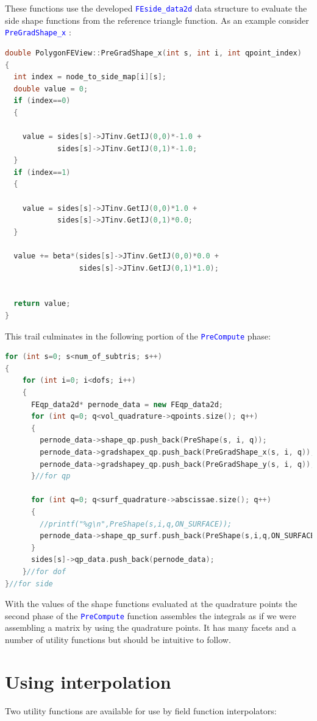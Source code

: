 \documentclass[11pt,letterpaper,titlepage]{article}
\newcommand{\xmltag}[1]{\textcolor{blue}{ \texttt{#1}} }
\begin{document}
These functions use the developed \xmltag{FEside\_data2d} data structure to evaluate the side shape functions from the reference triangle function.
\newline
\newline
As an example consider \xmltag{PreGradShape\_x}:
\newline 
\begin{lstlisting}[language=c++]
double PolygonFEView::PreGradShape_x(int s, int i, int qpoint_index)
{
  int index = node_to_side_map[i][s];
  double value = 0;
  if (index==0)
  {

    value = sides[s]->JTinv.GetIJ(0,0)*-1.0 +
            sides[s]->JTinv.GetIJ(0,1)*-1.0;
  }
  if (index==1)
  {

    value = sides[s]->JTinv.GetIJ(0,0)*1.0 +
            sides[s]->JTinv.GetIJ(0,1)*0.0;
  }

  value += beta*(sides[s]->JTinv.GetIJ(0,0)*0.0 +
                 sides[s]->JTinv.GetIJ(0,1)*1.0);


  return value;
}
\end{lstlisting}

This trail culminates in the following portion of the \xmltag{PreCompute} phase:
\begin{lstlisting}[language=c++]
for (int s=0; s<num_of_subtris; s++)
{
	for (int i=0; i<dofs; i++)
	{
	  FEqp_data2d* pernode_data = new FEqp_data2d;
	  for (int q=0; q<vol_quadrature->qpoints.size(); q++)
	  {
	    pernode_data->shape_qp.push_back(PreShape(s, i, q));
	    pernode_data->gradshapex_qp.push_back(PreGradShape_x(s, i, q));
	    pernode_data->gradshapey_qp.push_back(PreGradShape_y(s, i, q));
	  }//for qp
	
	  for (int q=0; q<surf_quadrature->abscissae.size(); q++)
	  {
	    //printf("%g\n",PreShape(s,i,q,ON_SURFACE));
	    pernode_data->shape_qp_surf.push_back(PreShape(s,i,q,ON_SURFACE));
	  }
	  sides[s]->qp_data.push_back(pernode_data);
	}//for dof
}//for side
\end{lstlisting}

With the values of the shape functions evaluated at the quadrature points the second phase of the \xmltag{PreCompute} function assembles the integrals as if we were assembling a matrix by using the quadrature points. It has many facets and a number of utility functions but should be intuitive to follow.


\vspace{0.5cm}
\section{Using interpolation}
Two utility functions are available for use by field function interpolators:
\end{document}
